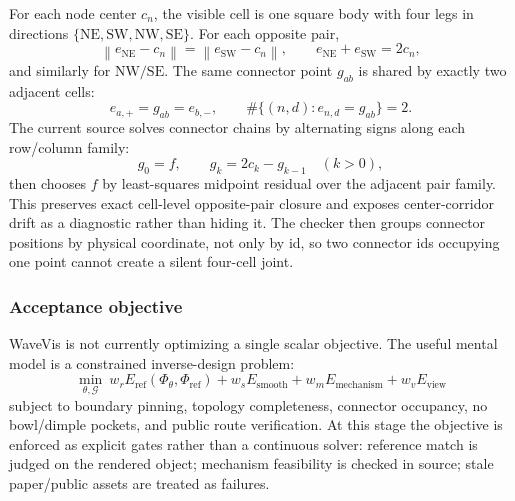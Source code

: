 \documentclass[12pt,letterpaper]{article}
\newcommand{\norm}[1]{\left\lVert #1 \right\rVert}
\begin{document}
For each node center \(c_n\), the visible cell is one square body with four legs in directions \(\{\mathrm{NE},\mathrm{SW},\mathrm{NW},\mathrm{SE}\}\). For each opposite pair,
\[
  \norm{e_{\mathrm{NE}}-c_n}=\norm{e_{\mathrm{SW}}-c_n}, \qquad
  e_{\mathrm{NE}}+e_{\mathrm{SW}}=2c_n,
\]
and similarly for \(\mathrm{NW}/\mathrm{SE}\). The same connector point \(g_{ab}\) is shared by exactly two adjacent cells:
\[
  e_{a,+}=g_{ab}=e_{b,-}, \qquad \#\{(n,d): e_{n,d}=g_{ab}\}=2.
\]
The current source solves connector chains by alternating signs along each row/column family:
\[
  g_0=f,\qquad
  g_k=2c_k-g_{k-1}\quad(k>0),
\]
then chooses \(f\) by least-squares midpoint residual over the adjacent pair family. This preserves exact cell-level opposite-pair closure and exposes center-corridor drift as a diagnostic rather than hiding it. The checker then groups connector positions by physical coordinate, not only by id, so two connector ids occupying one point cannot create a silent four-cell joint.

\subsubsection{Acceptance objective}

WaveVis is not currently optimizing a single scalar objective. The useful mental model is a constrained inverse-design problem:
\[
  \min_{\theta,\mathcal{G}}\ 
  w_r E_{\mathrm{ref}}(\Phi_\theta,\Phi_{\mathrm{ref}})
  +w_s E_{\mathrm{smooth}}
  +w_m E_{\mathrm{mechanism}}
  +w_v E_{\mathrm{view}}
\]
subject to boundary pinning, topology completeness, connector occupancy, no bowl/dimple pockets, and public route verification. At this stage the objective is enforced as explicit gates rather than a continuous solver: reference match is judged on the rendered object; mechanism feasibility is checked in source; stale paper/public assets are treated as failures.
\end{document}

